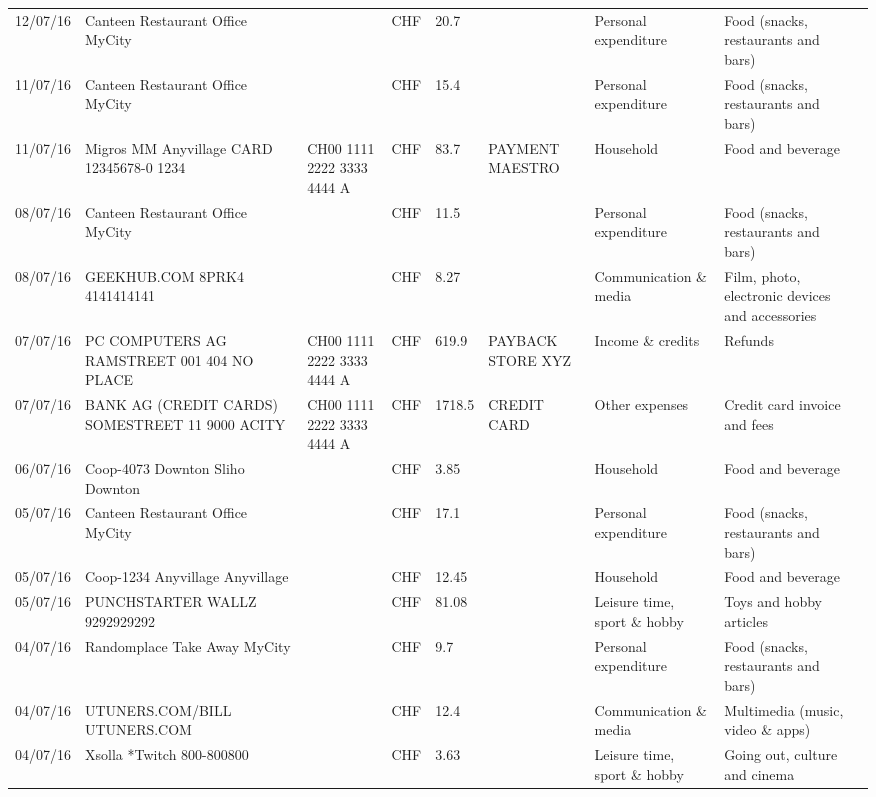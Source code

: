\begin{landscape}
\begin{tiny}
\begin{longtable}{lp{4cm}llllp{3cm}ll}
		    12/07/16 & Canteen Restaurant Office      MyCity &       & CHF   & 20.7  &       & Personal expenditure & Food (snacks, restaurants and bars) \\
		    11/07/16 & Canteen Restaurant Office      MyCity &       & CHF   & 15.4  &       & Personal expenditure & Food (snacks, restaurants and bars) \\
		    11/07/16 & Migros MM Anyvillage CARD 12345678-0 1234 & CH00 1111 2222 3333 4444 A & CHF   & 83.7  & PAYMENT MAESTRO & Household & Food and beverage \\
		    08/07/16 & Canteen Restaurant Office      MyCity &       & CHF   & 11.5  &       & Personal expenditure & Food (snacks, restaurants and bars) \\
		    08/07/16 & GEEKHUB.COM  8PRK4        4141414141 &       & CHF   & 8.27  &       & Communication \& media & Film, photo, electronic devices and accessories \\
		    07/07/16 & PC COMPUTERS AG RAMSTREET 001 404 NO PLACE & CH00 1111 2222 3333 4444 A & CHF   & 619.9 & PAYBACK STORE XYZ & Income \& credits & Refunds \\
		    07/07/16 & BANK AG (CREDIT CARDS) SOMESTREET 11 9000 ACITY & CH00 1111 2222 3333 4444 A & CHF   & 1718.5 & CREDIT CARD & Other expenses & Credit card invoice and fees \\
		    06/07/16 & Coop-4073 Downton Sliho   Downton &       & CHF   & 3.85  &       & Household & Food and beverage \\
		    05/07/16 & Canteen Restaurant Office      MyCity &       & CHF   & 17.1  &       & Personal expenditure & Food (snacks, restaurants and bars) \\
		    05/07/16 & Coop-1234 Anyvillage    Anyvillage &       & CHF   & 12.45 &       & Household & Food and beverage \\
		    05/07/16 & PUNCHSTARTER WALLZ   9292929292 &       & CHF   & 81.08 &       & Leisure time, sport \& hobby & Toys and hobby articles \\
		    04/07/16 & Randomplace Take Away     MyCity &       & CHF   & 9.7   &       & Personal expenditure & Food (snacks, restaurants and bars) \\
		    04/07/16 & UTUNERS.COM/BILL          UTUNERS.COM &       & CHF   & 12.4  &       & Communication \& media & Multimedia (music, video \& apps) \\
		    04/07/16 & Xsolla *Twitch           800-800800 &       & CHF   & 3.63  &       & Leisure time, sport \& hobby & Going out, culture and cinema \\

\end{longtable}
\end{tiny}
\end{landscape}
